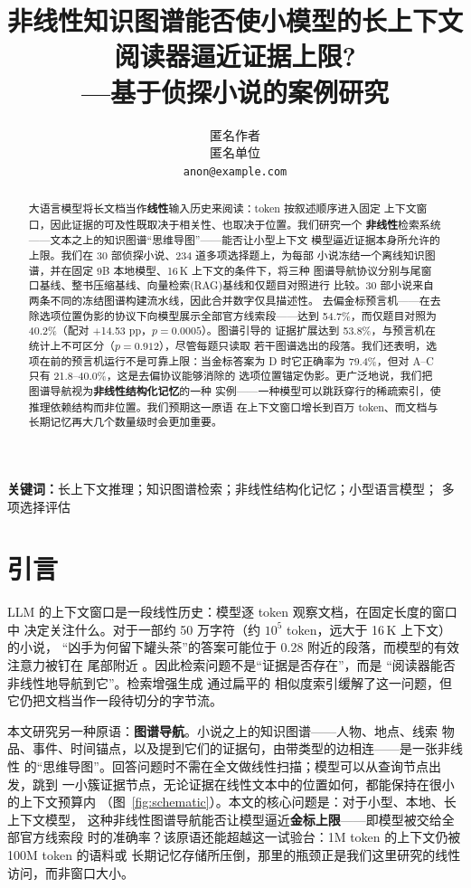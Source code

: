 \documentclass[UTF8,11pt]{ctexart}
\title{非线性知识图谱能否使小模型的长上下文阅读器逼近证据上限?\\
---基于侦探小说的案例研究}
\author{匿名作者 \\
匿名单位 \\
\texttt{anon@example.com}}
\newcommand{\pp}{\ensuremath{\,\mathrm{pp}}}
\begin{document}
\maketitle

\begin{abstract}
大语言模型将长文档当作\textbf{线性}输入历史来阅读：token 按叙述顺序进入固定
上下文窗口，因此证据的可及性既取决于相关性、也取决于位置。我们研究一个
\textbf{非线性}检索系统——文本之上的知识图谱``思维导图''——能否让小型上下文
模型逼近证据本身所允许的上限。我们在 30 部侦探小说、234 道多项选择题上，为每部
小说冻结一个离线知识图谱，并在固定 9B 本地模型、16\,K 上下文的条件下，将三种
图谱导航协议分别与尾窗口基线、整书压缩基线、向量检索(RAG)基线和仅题目对照进行
比较。30 部小说来自两条不同的冻结图谱构建流水线，因此合并数字仅具描述性。
去偏金标预言机——在去除选项位置伪影的协议下向模型展示全部官方线索段——达到
54.7\%，而仅题目对照为 40.2\%（配对 +14.53\,\pp{}，$p=0.0005$）。图谱引导的
证据扩展达到 53.8\%，与预言机在统计上不可区分（$p=0.912$），尽管每题只读取
若干图谱选出的段落。我们还表明，选项在前的预言机运行不是可靠上限：当金标答案为
D 时它正确率为 79.4\%，但对 A--C 只有 21.8--40.0\%，这是去偏协议能够消除的
选项位置锚定伪影。更广泛地说，我们把图谱导航视为\textbf{非线性结构化记忆}的一种
实例——一种模型可以跳跃穿行的稀疏索引，使推理依赖结构而非位置。我们预期这一原语
在上下文窗口增长到百万 token、而文档与长期记忆再大几个数量级时会更加重要。
\end{abstract}

\textbf{关键词：}长上下文推理；知识图谱检索；非线性结构化记忆；小型语言模型；
多项选择评估

\section{引言}
\label{sec:intro}

LLM 的上下文窗口是一段线性历史：模型逐 token 观察文档，在固定长度的窗口中
决定关注什么。对于一部约 50 万字符（约 $10^5$ token，远大于 16\,K 上下文）的小说，
``凶手为何留下罐头茶''的答案可能位于 0.28 附近的段落，而模型的有效注意力被钉在
尾部附近
\citep{liu2024lost,hsieh2024found}。因此检索问题不是``证据是否存在''，而是
``阅读器能否非线性地导航到它''。检索增强生成 \citep{lewis2020rag} 通过扁平的
相似度索引缓解了这一问题，但它仍把文档当作一段待切分的字节流。

本文研究另一种原语：\textbf{图谱导航}。小说之上的知识图谱——人物、地点、线索
物品、事件、时间锚点，以及提到它们的证据句，由带类型的边相连——是一张非线性
的``思维导图''。回答问题时不需在全文做线性扫描；模型可以从查询节点出发，跳到
一小簇证据节点，无论证据在线性文本中的位置如何，都能保持在很小的上下文预算内
（图~\ref{fig:schematic}）。本文的核心问题是：对于小型、本地、长上下文模型，
这种非线性图谱导航能否让模型逼近\textbf{金标上限}——即模型被交给全部官方线索段
时的准确率？该原语还能超越这一试验台：1M token 的上下文仍被 100M token 的语料或
长期记忆存储所压倒，那里的瓶颈正是我们这里研究的线性访问，而非窗口大小。
\end{document}
